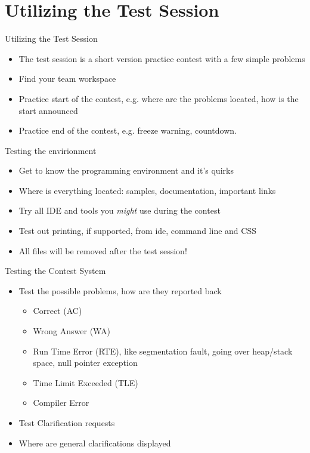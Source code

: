 \documentclass[11pt,pdf, aspectratio=169]{beamer}
\begin{document}
  \section{Utilizing the Test Session}
  \begin{frame}{Utilizing the Test Session}
    \begin{itemize}
      \item The test session is a short version practice contest with a few simple problems
      \item Find your team workspace
      \item Practice start of the contest, e.g. where are the problems located, how is the start announced
      \item Practice end of the contest, e.g. freeze warning, countdown.
    \end{itemize}
  \end{frame}
  \begin{frame}{Testing the envirionment}
    \begin{itemize}
      \item<1-> Get to know the programming environment and it's quirks
      \item <2-> Where is everything located: samples, documentation, important links
      \item <3-> Try all IDE and tools you \textit{might} use during the contest
      \item <4-> Test out printing, if supported, from ide, command line and CSS
      \item <5-> All files will be removed after the test session!
    \end{itemize}
  \end{frame}
  \begin{frame}{Testing the Contest System}
    \begin{itemize}
      \item Test the possible problems, how are they reported back
      \begin{itemize}
        \item Correct (AC)
        \item Wrong Answer (WA)
        \item Run Time Error (RTE), like segmentation fault, going over heap/stack space, null pointer exception
        \item Time Limit Exceeded (TLE)
        \item Compiler Error
      \end{itemize}
      \item Test Clarification requests
      \item Where are general clarifications displayed
    \end{itemize}
  \end{frame}
\end{document}
